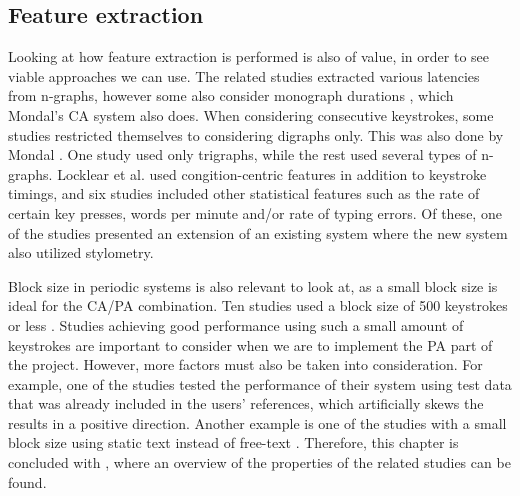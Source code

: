 \subsection{Feature extraction}
Looking at how feature extraction is performed is also of value, in order to see viable approaches we can use.
The related studies extracted various latencies from n-graphs, however some also consider monograph durations \cite{Pinto2014, superResults, KIM2017, Ahmed, Monrose, Janakiraman2007, monaco, BOURS201236, chi-square, Kolakowska2011, cognition, stewart, Tappert, pohmm}, which Mondal's \cite{mondal} CA system also does.
When considering consecutive keystrokes, some studies \cite{davoudi2009, davoudi2010, KIM2017, Ahmed, Janakiraman2007, Solami, BOURS201236, Monrose, park, monaco, chi-square, markov, Harun, occ, stewart, Tappert, meaningless, fast, pohmm} restricted themselves to considering digraphs only.
This was also done by Mondal \cite{mondal}.
One study \cite{900words} used only trigraphs, while the rest used several types of n-graphs.
Locklear et al. \cite{cognition} used congition-centric features in addition to keystroke timings,
and six studies \cite{occ, Tappert, stewart, alsultan, monaco, pohmm} included other statistical features such as the rate of certain key presses, words per minute and/or rate of typing errors.
Of these, one of the studies \cite{stewart} presented an  extension of an existing system \cite{Tappert} where the new system also utilized stylometry.

Block size in periodic systems is also relevant to look at, as a small block size is ideal for the CA/PA combination.
Ten studies used a block size of 500 keystrokes or less \cite{superResults, Messerman, Pinto2014, Ahmed, hu, park, Janakiraman2007, chi-square, markov, Harun, fast}.
Studies achieving good performance using such a small amount of keystrokes are important to consider when we are to implement the PA part of the project.
However, more factors must also be taken into consideration. 
For example, one of the studies \cite{chi-square} tested the performance of their system using test data that was already included in the users' references, which artificially skews the results in a positive direction.
Another example is one of the studies with a small block size using static text instead of free-text \cite{hu}.
Therefore, this chapter is concluded with , where an overview of the properties of the related studies can be found.


